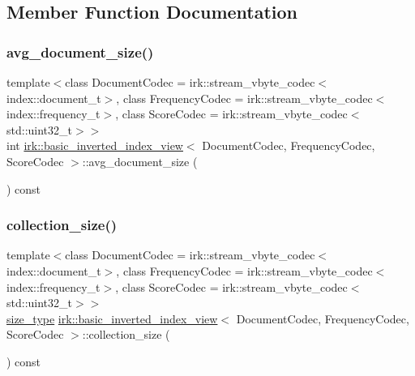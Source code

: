 \subsection{Member Function Documentation}
\mbox{\label{classirk_1_1basic__inverted__index__view_a2882c94b94350de22c6e58ada56ed523}} 
\subsubsection{\texorpdfstring{avg\+\_\+document\+\_\+size()}{avg\_document\_size()}}
{\footnotesize\ttfamily template$<$class Document\+Codec  = irk\+::stream\+\_\+vbyte\+\_\+codec$<$index\+::document\+\_\+t$>$, class Frequency\+Codec  = irk\+::stream\+\_\+vbyte\+\_\+codec$<$index\+::frequency\+\_\+t$>$, class Score\+Codec  = irk\+::stream\+\_\+vbyte\+\_\+codec$<$std\+::uint32\+\_\+t$>$$>$ \\
int \mbox{\hyperlink{classirk_1_1basic__inverted__index__view}{irk\+::basic\+\_\+inverted\+\_\+index\+\_\+view}}$<$ Document\+Codec, Frequency\+Codec, Score\+Codec $>$\+::avg\+\_\+document\+\_\+size (\begin{DoxyParamCaption}{ }\end{DoxyParamCaption}) const\hspace{0.3cm}{\ttfamily [inline]}}

\mbox{\label{classirk_1_1basic__inverted__index__view_a15e7fc01a2e9a4e79eef6fa6ca103632}} 
\subsubsection{\texorpdfstring{collection\+\_\+size()}{collection\_size()}}
{\footnotesize\ttfamily template$<$class Document\+Codec  = irk\+::stream\+\_\+vbyte\+\_\+codec$<$index\+::document\+\_\+t$>$, class Frequency\+Codec  = irk\+::stream\+\_\+vbyte\+\_\+codec$<$index\+::frequency\+\_\+t$>$, class Score\+Codec  = irk\+::stream\+\_\+vbyte\+\_\+codec$<$std\+::uint32\+\_\+t$>$$>$ \\
\mbox{\hyperlink{classirk_1_1basic__inverted__index__view_a57ae4c0a2a602340c31996d3e240be46}{size\+\_\+type}} \mbox{\hyperlink{classirk_1_1basic__inverted__index__view}{irk\+::basic\+\_\+inverted\+\_\+index\+\_\+view}}$<$ Document\+Codec, Frequency\+Codec, Score\+Codec $>$\+::collection\+\_\+size (\begin{DoxyParamCaption}{ }\end{DoxyParamCaption}) const\hspace{0.3cm}{\ttfamily [inline]}}

